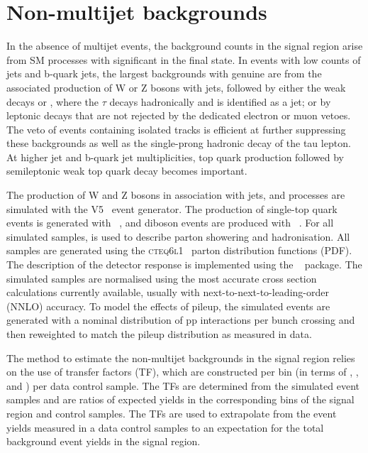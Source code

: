 \section{Non-multijet backgrounds}
\label{sec:ewk_background}

In the absence of multijet events, the background counts in the signal
region arise from SM processes with significant \met in the final
state. In events with low counts of jets and b-quark jets, the largest
backgrounds with genuine \met are from the associated production of W
or Z bosons with jets, followed by either the weak decays \znunu or
\wtaunu, where the $\tau$ decays hadronically and is identified as a
jet; or by leptonic decays that are not rejected by the dedicated
electron or muon vetoes. The veto of events containing isolated tracks
is efficient at further suppressing these backgrounds as well as the
single-prong hadronic decay of the tau lepton. At higher jet and
b-quark jet multiplicities, top quark production followed by
semileptonic weak top quark decay becomes important. 

The production of W and Z bosons in association with jets, \ttbar and \gj processes are simulated
with the \MADGRAPH V5~\cite{madgraph} event generator. The production
of single-top quark events is generated with
\POWHEG~\cite{powheg}, and diboson events are produced with
~\cite{pythia8}. For all simulated samples,  is
used to describe parton showering and hadronisation. All samples are
generated using the \textsc{cteq6l1}~\cite{Pumplin:2002vw} parton
distribution functions (PDF). The description of the detector response
is implemented using the \GEANTfour~\cite{geant} package. The
simulated samples are normalised using the most accurate cross section
calculations currently available, usually with
next-to-next-to-leading-order (NNLO) accuracy. To model the effects of
pileup, the simulated events are generated with a nominal distribution
of pp interactions per bunch crossing and then reweighted to match the
pileup distribution as measured in data.

The method to estimate the non-multijet backgrounds in the signal
region relies on the use of transfer factors (TF), which are
constructed per bin (in terms of \njet, \nb, and \scalht) per data
control sample. The TFs are determined from the simulated event
samples and are ratios of expected yields in the corresponding bins of
the signal region and control samples. The TFs are used to extrapolate
from the event yields measured in a data control samples to an
expectation for the total background event yields in the signal
region. 

